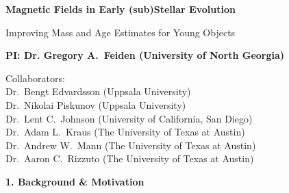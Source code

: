 \documentclass[12pt,letter]{article}
\begin{document}
\thispagestyle{empty}


\begin{center}
	{\bf {\Large Magnetic Fields in Early (sub)Stellar Evolution}
	
	{\large Improving Mass and Age Estimates for Young Objects}}
\end{center}

\begin{center}
	{\bf PI: Dr. Gregory A.~Feiden (University of North Georgia)} 
	
	Collaborators: \\
	Dr.~Bengt Edvardsson (Uppsala University) \\
	Dr.~Nikolai Piskunov (Uppsala University) \\
	Dr.~Lent C.~Johnson (University of California, San Diego) \\
	Dr.~Adam L.~Kraus (The University of Texas at Austin) \\
	Dr.~Andrew W.~Mann (The University of Texas at Austin) \\
	Dr.~Aaron C.~Rizzuto (The University of Texas at Austin) \\
\end{center}

\tableofcontents

\clearpage

{\bf\large 1. Background \& Motivation}  







\clearpage


%

\clearpage



\clearpage



\clearpage


\end{document}
